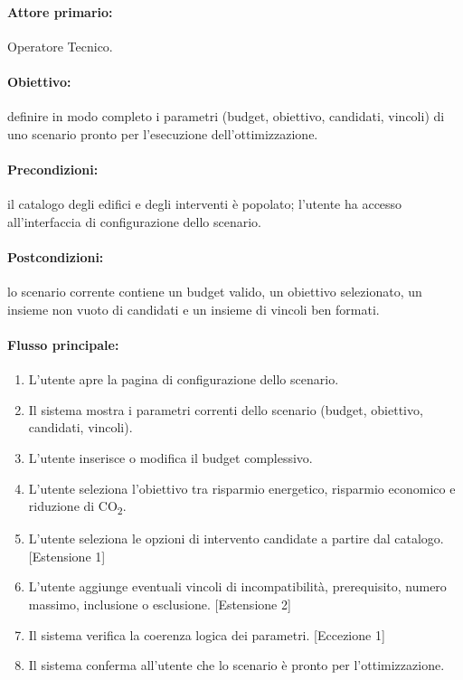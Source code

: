 \paragraph{Attore primario:} Operatore Tecnico.

\paragraph{Obiettivo:} definire in modo completo i parametri (budget, obiettivo, candidati, vincoli) di uno scenario pronto per l'esecuzione dell'ottimizzazione.

\paragraph{Precondizioni:} il catalogo degli edifici e degli interventi è popolato; l'utente ha accesso all'interfaccia di configurazione dello scenario.

\paragraph{Postcondizioni:} lo scenario corrente contiene un budget valido, un obiettivo selezionato, un insieme non vuoto di candidati e un insieme di vincoli ben formati.

\paragraph{Flusso principale:}
\begin{enumerate}
    \item L'utente apre la pagina di configurazione dello scenario.
    \item Il sistema mostra i parametri correnti dello scenario (budget, obiettivo, candidati, vincoli).
    \item L'utente inserisce o modifica il budget complessivo.
    \item L'utente seleziona l'obiettivo tra risparmio energetico, risparmio economico e riduzione di CO\textsubscript{2}.
    \item L'utente seleziona le opzioni di intervento candidate a partire dal catalogo. [Estensione 1]
    \item L'utente aggiunge eventuali vincoli di incompatibilità, prerequisito, numero massimo, inclusione o esclusione. [Estensione 2]
    \item Il sistema verifica la coerenza logica dei parametri. [Eccezione 1]
    \item Il sistema conferma all'utente che lo scenario è pronto per l'ottimizzazione.
\end{enumerate}

